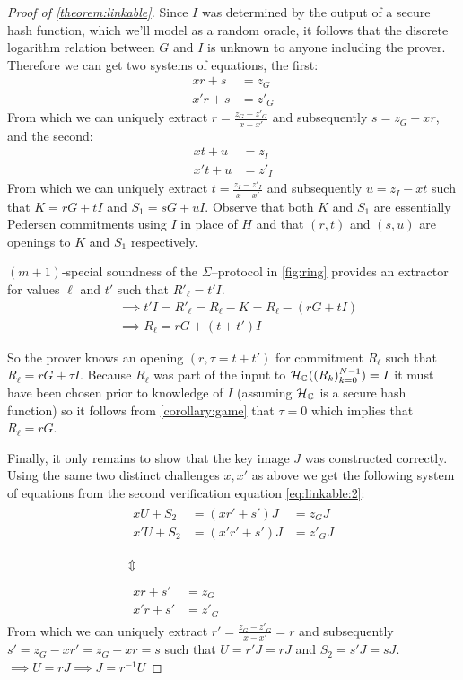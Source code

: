 \begin{proof}[Proof of \cref{theorem:linkable}]
	Since $I$ was determined by the output of a secure hash function, which we'll model as a random oracle, it follows that the discrete logarithm relation between $G$ and $I$ is unknown to anyone including the prover.
	Therefore we can get two systems of equations, the first:
	$$\begin{aligned}
	x r + s &= z _G \\
	x'r + s &= z'_G
	\end{aligned}$$
	From which we can uniquely extract $r = \frac{z_G - z'_G}{x - x'}$ and subsequently $s = z_G - xr$, and the second:
	$$\begin{aligned}
	x t + u &= z _I \\
	x't + u &= z'_I
	\end{aligned}$$
	From which we can uniquely extract $t = \frac{z_I - z'_I}{x - x'}$ and subsequently $u = z_I - xt$ such that $K = rG + tI$ and $S_1 = sG + uI$.
	Observe that both $K$ and $S_1$ are essentially Pedersen commitments using $I$ in place of $H$ and that $(r, t)$ and $(s, u)$ are openings to $K$ and $S_1$ respectively.

	$(m+1)$-special soundness of the $\Sigma$--protocol in \cref{fig:ring} provides an extractor for values $\ell$ and $t'$ such that $R'_\ell = t' I$.
	$$\begin{aligned}
	&\implies t' I = R'_\ell = R_\ell - K = R_\ell - (rG + tI) \\
	&\implies R_\ell = rG + (t + t') I
	\end{aligned}$$

	So the prover knows an opening $(r, \tau = t + t')$ for commitment $R_\ell$ such that $R_\ell = rG + \tau I$.
	Because $R_\ell$ was part of the input to $\mathcal H_\mathbb G((R_k)_{k=0}^{N-1}) = I$ it must have been chosen prior to knowledge of $I$ (assuming $\mathcal H_\mathbb G$ is a secure hash function) so it follows from \cref{corollary:game} that $\tau = 0$ which implies that $R_\ell = rG$.

	Finally, it only remains to show that the key image $J$ was constructed correctly.
	Using the same two distinct challenges $x, x'$ as above we get the following system of equations from the second verification equation \cref{eq:linkable:2}:
	$$\begin{matrix}\begin{aligned}
	x U + S_2 &= (x r' + s')J &= z _G J \\
	x'U + S_2 &= (x'r' + s')J &= z'_G J \\
	\end{aligned} \\ \\
	\Updownarrow \\ \\
	\begin{aligned}
	x r + s' &= z _G \\
	x'r + s' &= z'_G
	\end{aligned}\end{matrix}$$
	From which we can uniquely extract $r' = \frac{z_G - z'_G}{x - x'} = r$ and subsequently $s' = z_G - xr' = z_G - xr = s$ such that $U = r'J = rJ$ and $S_2 = s'J = sJ$.
	$\implies U = rJ \implies J = r^{-1}U$
\end{proof}

